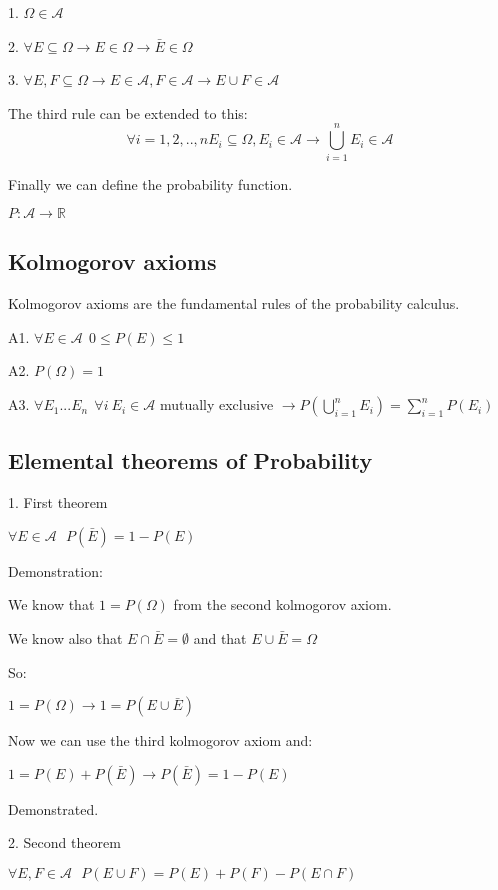 \documentclass{article}
\begin{document}
1. $\Omega \in \mathcal{A}$

2. $\forall E \subseteq \Omega \longrightarrow E \in \Omega \rightarrow \bar E \in \Omega$

3. $\forall E,F \subseteq \Omega \longrightarrow E \in \mathcal{A}, F \in \mathcal{A} \rightarrow E \cup F \in \mathcal{A}$

The third rule can be extended to this: $$\forall i=1,2,..,n E_i \subseteq \Omega, E_i \in \mathcal{A} \rightarrow \bigcup_{i=1}^nE_i \in \mathcal{A}$$

Finally we can define the probability function.

$P  :  \mathcal{A} \rightarrow \mathbb{R}$

\subsection{Kolmogorov axioms}

Kolmogorov axioms are the fundamental rules of the probability calculus.

A1. $\forall E \in \mathcal{A} \ \ 0 \leq P(E) \leq 1$

A2. $P(\Omega) = 1$

A3. $\forall E_1...E_n \ \ \forall i \ E_i \in \mathcal{A}$ mutually exclusive $\rightarrow P(\bigcup_{i=1}^nE_i) = \sum_{i=1}^nP(E_i)$

\subsection{Elemental theorems of Probability}

1. First theorem

$\forall E \in \mathcal{A} \ \ \ P(\bar E) = 1 - P(E)$
\bigskip

Demonstration:

We know that $1 = P(\Omega)$ from the second kolmogorov axiom.

We know also that $E \cap \bar E = \emptyset$ and that $E \cup \bar E = \Omega$

So:

$1 = P(\Omega) \rightarrow 1 = P(E \cup \bar E)$

Now we can use the third kolmogorov axiom and:

$1 = P(E) + P(\bar E) \rightarrow P(\bar E) = 1 - P(E)$

Demonstrated.
\bigskip

2. Second theorem

$\forall E,F \in \mathcal{A} \ \ \ P(E \cup F) = P(E) + P(F) - P(E \cap F)$
\bigskip
\end{document}
